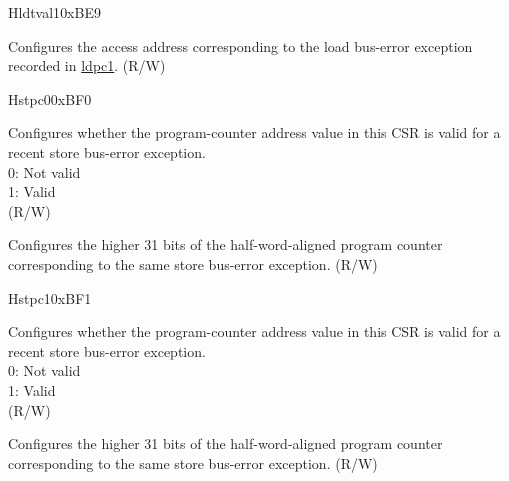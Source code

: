 \begin{register}{H}{ldtval1}{0xBE9}\label{regdesc:LDTVAL1}%
%
\regnewline%
\begin{regdesc}\begin{reglist}
\label{fielddesc:LDTVAL1_ADDR}\item [{ADDR}] Configures the access address corresponding to the load bus-error exception recorded in \hyperref[regdesc:LDPC1]{ldpc1}. (R/W)
\end{reglist}\end{regdesc}
\end{register}

\begin{register}{H}{stpc0}{0xBF0}\label{regdesc:STPC0}%
%
%
\regnewline%
\begin{regdesc}\begin{reglist}
\label{fielddesc:STPC0_VLD}\item [VLD] Configures whether the program-counter address value in this CSR is valid for a recent store bus-error exception.\\
0: Not valid\\
1: Valid\\
(R/W)
\label{fielddesc:STPC0_ADDR}\item [{ADDR}] Configures the higher 31 bits of the half-word-aligned program counter corresponding to the same store bus-error exception. (R/W)
\end{reglist}\end{regdesc}
\end{register}

\begin{register}{H}{stpc1}{0xBF1}\label{regdesc:STPC1}%
%
%
\regnewline%
\begin{regdesc}\begin{reglist}
\label{fielddesc:STPC1_VLD}\item [VLD] Configures whether the program-counter address value in this CSR is valid for a recent store bus-error exception. \\
0: Not valid\\
1: Valid\\
(R/W)
\label{fielddesc:STPC1_ADDR}\item [{ADDR}] Configures the higher 31 bits of the half-word-aligned program counter corresponding to the same store bus-error exception. (R/W)
\end{reglist}\end{regdesc}
\end{register}

